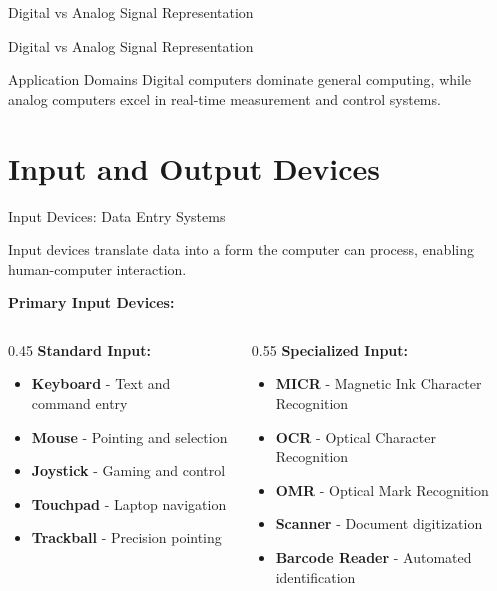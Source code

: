 \documentclass[aspectratio=169]{beamer}
\begin{document}
\begin{frame}{Digital vs Analog Signal Representation}
\end{frame}


\begin{frame}{Digital vs Analog Signal Representation} 
    \begin{exampleblock}{Application Domains}
        Digital computers dominate general computing, while analog computers excel in real-time measurement and control systems.
    \end{exampleblock}
\end{frame}

\section{Input and Output Devices}

\begin{frame}{Input Devices: Data Entry Systems}
    \begin{definition}
        Input devices translate data into a form the computer can process, enabling human-computer interaction.
    \end{definition} 
    \textbf{Primary Input Devices:}
    
    \begin{columns}
        \begin{column}{0.45\textwidth}
            \textbf{Standard Input:}
            \begin{itemize}
                \item \textbf{Keyboard} - Text and command entry
                \item \textbf{Mouse} - Pointing and selection
                \item \textbf{Joystick} - Gaming and control
                \item \textbf{Touchpad} - Laptop navigation
                \item \textbf{Trackball} - Precision pointing
            \end{itemize}
        \end{column}
        \begin{column}{0.55\textwidth}
            \textbf{Specialized Input:}
            \begin{itemize}
                \item \textbf{MICR} - Magnetic Ink Character Recognition
                \item \textbf{OCR} - Optical Character Recognition
                \item \textbf{OMR} - Optical Mark Recognition
                \item \textbf{Scanner} - Document digitization
                \item \textbf{Barcode Reader} - Automated identification
            \end{itemize}
        \end{column}
    \end{columns}
    

\end{frame}
\end{document}
